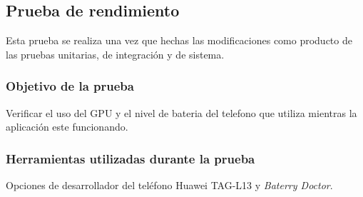 \subsection{Prueba de rendimiento}
Esta prueba se realiza una vez que hechas las modificaciones como producto de las pruebas unitarias, de integración y de sistema.
\subsubsection{Objetivo de la prueba}
Verificar el uso del GPU y el nivel de bateria del telefono que utiliza mientras la aplicación este funcionando. 
\subsubsection{Herramientas utilizadas durante la prueba}
Opciones de desarrollador del teléfono Huawei TAG-L13 y \textit{Baterry Doctor}.
